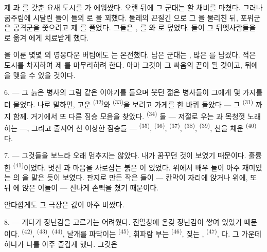 제 과 를 갖춘 요새 도시를 가 에워쌌다.
오랜  뒤에 그 군대는 할 채비를 마쳤다. 그러나 굶주림에 시달린
들이 들의 로 을 꾀했다.
 둘레의 끈질긴 으로 그 을 물리친 뒤,
 포위군은  공격군을 쫓으려고 제 를 풀었다. 그들은
, 를 와 로 덮었다.
들이 그 뒤엣사람들을 로 옮겨
에게 치료받게 했다.

을 이룬 몇몇 의 영웅다운 버팀에도 는 온전했다.
남은 군대는 , 많은 를 남겼다. 적은 도시를 차지하여 제
를 마무리하려 한다. 아마 그것이 그 싸움의 끝이 될 것이고,
 뒤에 을 맺을 수 있을 것이다.

\VUsaut{4.4mm}
\VUsaut{2.8mm}

6. --- 그 늙은 병사의 그림 같은 이야기를 들으며 웃던 젊은 병사들이 그에게 몇 가지를 더
물었다. 나로 말하면, 고운  \textsuperscript{(32)}와 
\textsuperscript{(33)}을 보려고 가게를 한 바퀴 돌았다 — 그  \textsuperscript{(31)}
까지 함께. 거기에서 또 다른 짐승 모음을 찾았다.  \textsuperscript{(34)}
둘 — 저절로 우는 과 목청껏 노래하는  —, 그리고
줄지어 선 이상한 짐승들 —  \textsuperscript{(35)}, 
\textsuperscript{(36)},  \textsuperscript{(37)},  \textsuperscript{(38)},
 \textsuperscript{(39)}, 천을 채운  \textsuperscript{(40)}다.

7. --- 그것들을 보느라 오래 멈추지는 않았다. 내가 꿈꾸던 것이 보였기 때문이다. 훌륭한
 \textsuperscript{(41)}이었다. 멋진 과 마음을 사로잡는
붉은 이 있었다.  위에서 배우 둘이 아주 재미있는 의
을 맡은 듯이 보였다. 판지로 만든 작은 들이 — 칸막이 자리에
앉거나  위에, 또  뒤 에 앉은
이들이 — 신나게 손뼉을 쳤기 때문이다.

안타깝게도 그 극장은 값이 아주 비쌌다.

8. --- 게다가 장난감을 고르기는 어려웠다. 진열창에 온갖 장난감이 쌓여 있었기 때문이다.
 \textsuperscript{(42)},  \textsuperscript{(43)},
 \textsuperscript{(44)}, 날개를 파닥이는  \textsuperscript{(45)},
휘파람 부는  \textsuperscript{(46)}, 짖는 ,
 \textsuperscript{(47)}, 다. 그 가운데 하나가 나를 아주
즐겁게 했다. 그것은

